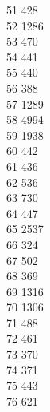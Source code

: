 { 51	428 \\
 52	1286 \\
 53	470 \\
 54	441 \\
 55	440 \\
 56	388 \\
 57	1289 \\
 58	4994 \\
 59	1938 \\
 60	442 \\
 61	436 \\
 62	536 \\
 63	730 \\
 64	447 \\
 65	2537 \\
 66	324 \\
 67	502 \\
 68	369 \\
 69	1316 \\
 70	1306 \\
 71	488 \\
 72	461 \\
 73	370 \\
 74	371 \\
 75	443 \\
 76	621 \\
}
